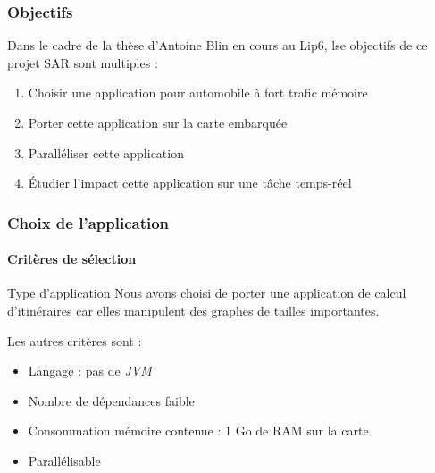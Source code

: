 \begin{frame}
  \frametitle{Objectifs}
  Dans le cadre de la thèse d'Antoine Blin en cours au Lip6, lse objectifs de
  ce projet SAR sont multiples :
  \vspace{1em}
  \begin{enumerate}
  \item Choisir une application pour automobile à fort trafic mémoire
    \vspace{1em}
  \item Porter cette application sur la carte embarquée
    \vspace{1em}
  \item Paralléliser cette application
    \vspace{1em}
  \item \'Etudier l'impact cette application sur une tâche temps-réel
  \end{enumerate}
\end{frame}

\begin{frame}
  \frametitle{Choix de l'application}
  \framesubtitle{Critères de sélection}
  \begin{block}{Type d'application}
    Nous avons choisi de porter une application de calcul d'itinéraires car elles
    manipulent des graphes de tailles importantes.
  \end{block}
  Les autres critères sont :
  \begin{itemize}
  \item Langage : pas de \textit{JVM}
    \vspace{1em}
  \item Nombre de dépendances faible
    \vspace{1em}
  \item Consommation mémoire contenue : 1 Go de RAM sur la carte
    \vspace{1em}
  \item Parallélisable
  \end{itemize}
\end{frame}

